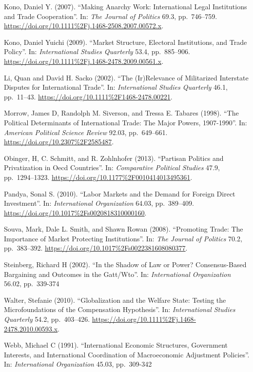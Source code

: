 \documentclass[10pt,]{article}
\begin{document}
Kono, Daniel Y. (2007). ``Making Anarchy Work: International Legal
Institutions and Trade Cooperation''. In: \emph{The Journal of Politics}
69.3, pp.~746--759.
\url{https://doi.org/10.1111\%2Fj.1468-2508.2007.00572.x}.

Kono, Daniel Yuichi (2009). ``Market Structure, Electoral Institutions,
and Trade Policy''. In: \emph{International Studies Quarterly} 53.4,
pp.~885--906. \url{https://doi.org/10.1111\%2Fj.1468-2478.2009.00561.x}.

Li, Quan and David H. Sacko (2002). ``The (Ir)Relevance of Militarized
Interstate Disputes for International Trade''. In:
\emph{International Studies Quarterly} 46.1, pp.~11--43.
\url{https://doi.org/10.1111\%2F1468-2478.00221}.

Morrow, James D, Randolph M. Siverson, and Tressa E. Tabares (1998).
``The Political Determinants of International Trade: The Major Powers,
1907-1990''. In: \emph{American Political Science Review} 92.03,
pp.~649--661. \url{https://doi.org/10.2307\%2F2585487}.

Obinger, H, C. Schmitt, and R. Zohlnhofer (2013). ``Partisan Politics
and Privatization in Oecd Countries''. In:
\emph{Comparative Political Studies} 47.9, pp.~1294--1323.
\url{https://doi.org/10.1177\%2F0010414013495361}.

Pandya, Sonal S. (2010). ``Labor Markets and the Demand for Foreign
Direct Investment''. In: \emph{International Organization} 64.03,
pp.~389--409. \url{https://doi.org/10.1017\%2Fs0020818310000160}.

Souva, Mark, Dale L. Smith, and Shawn Rowan (2008). ``Promoting Trade:
The Importance of Market Protecting Institutions''. In:
\emph{The Journal of Politics} 70.2, pp.~383--392.
\url{https://doi.org/10.1017\%2Fs0022381608080377}.

Steinberg, Richard H (2002). ``In the Shadow of Law or Power?
Consensus-Based Bargaining and Outcomes in the Gatt/Wto''. In:
\emph{International Organization} 56.02, pp.~339-374

Walter, Stefanie (2010). ``Globalization and the Welfare State: Testing
the Microfoundations of the Compensation Hypothesis''. In:
\emph{International Studies Quarterly} 54.2, pp.~403--426.
\url{https://doi.org/10.1111\%2Fj.1468-2478.2010.00593.x}.

Webb, Michael C (1991). ``International Economic Structures, Government
Interests, and International Coordination of Macroeconomic Adjustment
Policies''. In: \emph{International Organization} 45.03, pp.~309-342
\end{document}
